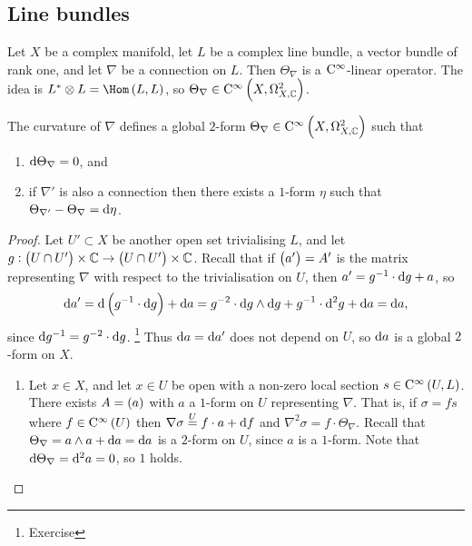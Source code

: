 \pagebreak

\subsection{Line bundles}

Let $ X $ be a complex manifold, let $ L $ be a complex line bundle, a vector bundle of rank one, and let $ \nabla $ be a connection on $ L $. Then $ \Theta_\nabla $ is a $ \mathrm{C}^\infty $-linear operator. The idea is $ L^* \otimes L = \Hom\br{L, L} $, so $ \Theta_\nabla \in \C^\infty\br{X, \Omega_{X, \CC}^2} $.

\begin{proposition}
The curvature of $ \nabla $ defines a global $ 2 $-form $ \Theta_\nabla \in \C^\infty\br{X, \Omega_{X, \CC}^2} $ such that
\begin{enumerate}
\item $ \mathrm{d}\Theta_\nabla = 0 $, and
\item if $ \nabla' $ is also a connection then there exists a $ 1 $-form $ \eta $ such that $ \Theta_{\nabla'} - \Theta_\nabla = \mathrm{d}\eta $.
\end{enumerate}
\end{proposition}

\begin{proof}
Let $ U' \subset X $ be another open set trivialising $ L $, and let $ g : \br{U \cap U'} \times \CC \to \br{U \cap U'} \times \CC $. Recall that if $ \br{a'} = A' $ is the matrix representing $ \nabla $ with respect to the trivialisation on $ U $, then $ a' = g^{-1} \cdot \mathrm{d} g + a $, so
$$ \d a' = \d\br{g^{-1} \cdot \d g} + \d a = g^{-2} \cdot \d g \wedge \d g + g^{-1} \cdot \d^2g + \d a = \d a, $$
since $ \mathrm{d} g^{-1} = g^{-2} \cdot \mathrm{d} g $. \footnote{Exercise} Thus $ \mathrm{d} a = \mathrm{d} a' $ does not depend on $ U $, so $ \mathrm{d} a $ is a global $ 2 $-form on $ X $.
\begin{enumerate}
\item Let $ x \in X $, and let $ x \in U $ be open with a non-zero local section $ s \in \C^\infty\br{U, L} $. There exists $ A = \br{a} $ with $ a $ a $ 1 $-form on $ U $ representing $ \nabla $. That is, if $ \sigma = fs $ where $ f \in \C^\infty\br{U} $ then $ \nabla\sigma \overset{U}{=} f \cdot a + \mathrm{d} f $ and $ \nabla^2\sigma = f \cdot \Theta_\nabla $. Recall that $ \Theta_\nabla = a \wedge a + \mathrm{d} a = \mathrm{d} a $ is a $ 2 $-form on $ U $, since $ a $ is a $ 1 $-form. Note that $ \mathrm{d}\Theta_\nabla = \mathrm{d}^2a = 0 $, so $ 1 $ holds.
\end{enumerate}
\end{proof}

